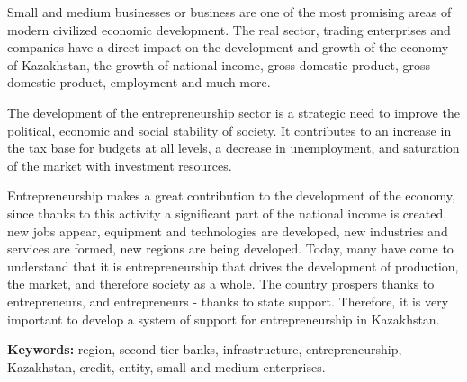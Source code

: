 Small and medium businesses or business are one of the most promising
areas of modern civilized economic development. The real sector, trading
enterprises and companies have a direct impact on the development and
growth of the economy of Kazakhstan, the growth of national income,
gross domestic product, gross domestic product, employment and much
more.

The development of the entrepreneurship sector is a strategic need to
improve the political, economic and social stability of society. It
contributes to an increase in the tax base for budgets at all levels, a
decrease in unemployment, and saturation of the market with investment
resources.

Entrepreneurship makes a great contribution to the development of the
economy, since thanks to this activity a significant part of the
national income is created, new jobs appear, equipment and technologies
are developed, new industries and services are formed, new regions are
being developed. Today, many have come to understand that it is
entrepreneurship that drives the development of production, the market,
and therefore society as a whole. The country prospers thanks to
entrepreneurs, and entrepreneurs - thanks to state support. Therefore,
it is very important to develop a system of support for entrepreneurship
in Kazakhstan.

{\bfseries Keywords:} region, second-tier banks, infrastructure,
entrepreneurship, Kazakhstan, credit, entity, small and medium
enterprises.

